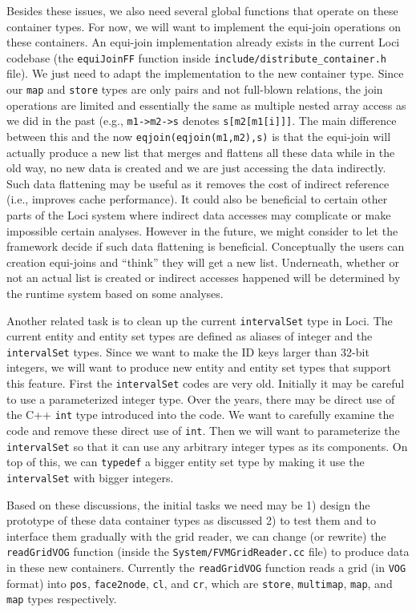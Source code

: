 \documentclass{article}
\begin{document}
Besides these issues, we also need several global functions that
operate on these container types.  For now, we will want to implement
the equi-join operations on these containers.  An equi-join
implementation already exists in the current Loci codebase (the
\texttt{equiJoinFF} function inside
\verb|include/distribute_container.h| file).  We just need to adapt
the implementation to the new container type.  Since our \texttt{map}
and \texttt{store} types are only pairs and not full-blown relations,
the join operations are limited and essentially the same as multiple
nested array access as we did in the past (e.g., \texttt{m1->m2->s}
denotes \texttt{s[m2[m1[i]]]}.  The main difference between this and the
now \texttt{eqjoin(eqjoin(m1,m2),s)} is that the equi-join will actually
produce a new list that merges and flattens all these data while in the
old way, no new data is created and we are just accessing the data
indirectly.  Such data flattening may be useful as it removes the cost
of indirect reference (i.e., improves cache performance).  It could also
be beneficial to certain other parts of the Loci system where indirect
data accesses may complicate or make impossible certain analyses.
However in the future, we might consider to let the framework decide if
such data flattening is beneficial.  Conceptually the users can creation
equi-joins and ``think'' they will get a new list.  Underneath, whether
or not an actual list is created or indirect accesses happened will be
determined by the runtime system based on some analyses.

Another related task is to clean up the current \texttt{intervalSet}
type in Loci.  The current entity and entity set types are defined as
aliases of integer and the \texttt{intervalSet} types.  Since we want to
make the ID keys larger than 32-bit integers, we will want to produce
new entity and entity set types that support this feature.  First the
\texttt{intervalSet} codes are very old.  Initially it may be careful
to use a parameterized integer type.  Over the years, there may be
direct use of the C++ \texttt{int} type introduced into the code.  We
want to carefully examine the code and remove these direct use of
\texttt{int}.  Then we will want to parameterize the
\texttt{intervalSet} so that it can use any arbitrary integer types as
its components.  On top of this, we can \texttt{typedef} a bigger entity
set type by making it use the \texttt{intervalSet} with bigger integers.

Based on these discussions, the initial tasks we need may be 1) design
the prototype of these data container types as discussed 2) to test them
and to interface them gradually with the grid reader, we can change (or
rewrite) the \texttt{readGridVOG} function (inside the
\texttt{System/FVMGridReader.cc} file) to produce data in these new
containers.  Currently the \texttt{readGridVOG} function reads a grid
(in \texttt{VOG} format) into \texttt{pos}, \texttt{face2node},
\texttt{cl}, and \texttt{cr}, which are \texttt{store},
\texttt{multimap}, \texttt{map}, and \texttt{map} types respectively. 
\end{document}
